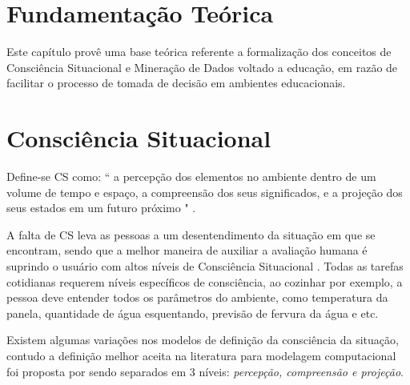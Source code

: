 \documentclass[12pt]{article}
\begin{document}
\section{Fundamentação Teórica} \label{sec:firstpage}
	
Este capítulo provê uma base teórica referente a formalização dos conceitos de Consciência Situacional e Mineração de Dados voltado a educação, em razão de facilitar o processo de tomada de decisão em ambientes educacionais.  

\section{Consciência Situacional}

Define-se CS como: `` a percepção dos elementos no ambiente dentro de um volume de tempo e espaço, a compreensão dos seus significados, e a projeção dos seus estados em um futuro próximo " \cite [p. 97]{Endsley1988}.

A falta de CS leva as pessoas a um desentendimento da situação em que se encontram, sendo que a melhor maneira de auxiliar a avaliação humana é suprindo o usuário com altos níveis de Consciência Situacional \cite{Endsley2012}. Todas as tarefas cotidianas requerem níveis específicos de consciência, ao cozinhar por exemplo, a pessoa deve entender todos os parâmetros do ambiente, como temperatura da panela, quantidade de água esquentando, previsão de fervura da água e etc.

Existem algumas variações nos modelos de definição da consciência da situação, contudo a definição melhor aceita na literatura para modelagem computacional foi proposta por \cite{Endsley1995} sendo separados em 3 níveis: \emph{percepção, compreensão e projeção}.
\end{document}
